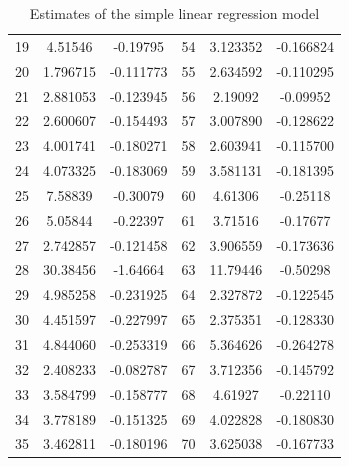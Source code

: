 \begin{table}
\begin{tabular}{c:cc|c:cc}
        19 & 4.51546 & -0.19795 & 54 & 3.123352 & -0.166824\\ 
        20 & 1.796715 & -0.111773 & 55 & 2.634592 & -0.110295\\ 
        21 & 2.881053 & -0.123945 & 56 & 2.19092 & -0.09952\\ 
        22 & 2.600607 & -0.154493 & 57 & 3.007890 & -0.128622\\ 
        23 & 4.001741 & -0.180271 & 58 & 2.603941 & -0.115700\\ 
        24 & 4.073325 & -0.183069 & 59 & 3.581131 & -0.181395\\ 
        25 & 7.58839 & -0.30079 & 60 & 4.61306 & -0.25118\\ 
        26 & 5.05844 & -0.22397 & 61 & 3.71516 & -0.17677\\ 
        27 & 2.742857 & -0.121458 & 62 & 3.906559 & -0.173636\\ 
        28 & 30.38456 & -1.64664 & 63 & 11.79446 & -0.50298\\ 
        29 & 4.985258 & -0.231925 & 64 & 2.327872 & -0.122545\\ 
        30 & 4.451597 & -0.227997 & 65 & 2.375351 & -0.128330\\ 
        31 & 4.844060 & -0.253319 & 66 & 5.364626 & -0.264278\\ 
        32 & 2.408233 & -0.082787 & 67 & 3.712356 & -0.145792\\ 
        33 & 3.584799 & -0.158777 & 68 & 4.61927 & -0.22110 \\ 
        34 & 3.778189 & -0.151325 & 69 & 4.022828 & -0.180830 \\ 
        35 & 3.462811 & -0.180196 & 70 & 3.625038 & -0.167733\\
        \hline
    \end{tabular}
    \caption{Estimates of the simple linear regression model}
    \label{tab: est_simple_lm}
\end{table}

